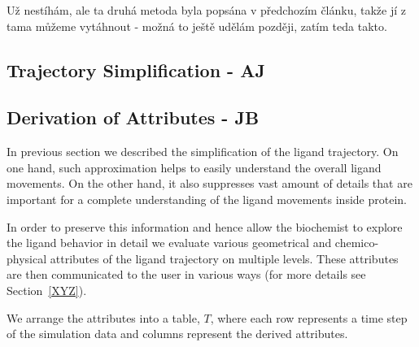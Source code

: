 \documentclass[twocolumn]{bmcart}%
\begin{document}
{\color{red} Už nestíhám, ale ta druhá metoda byla popsána v předchozím článku, takže jí z tama můžeme vytáhnout - možná to ještě udělám později, zatím teda takto.}


\subsection*{Trajectory Simplification - AJ}


\subsection*{Derivation of Attributes - JB}

In previous section we described the simplification of the ligand trajectory. 
On one hand, such approximation helps to easily understand the overall ligand movements. 
On the other hand, it also suppresses vast amount of details that are important for a complete understanding of the ligand movements inside protein.

In order to preserve this information and hence allow the biochemist to explore the ligand behavior in detail we evaluate various geometrical and chemico-physical attributes of the ligand trajectory on multiple levels. 
These attributes are then communicated to the user in various ways (for more details {\color{red}see Section~\ref{XYZ}}).

We arrange the attributes into a table, $T$, where each row represents a time step of the simulation data and columns represent the derived attributes. 
\end{document}
